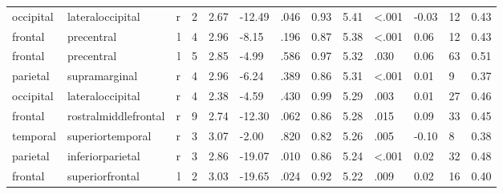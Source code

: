 \documentclass{article}
\begin{document}
\begin{longtable}{llrR{1.3cm}R{1cm}R{1.3cm}R{1cm}R{1cm}R{1.3cm}R{1cm}R{1.8cm}R{1.3cm}R{1.8cm}}
 occipital &          lateraloccipital &    r &         2 &                  2.67 &           -12.49 &               .046 &                               0.93 &                          5.41 &                   \textless.001 &  -0.03 &     12 &      0.43 \\
   frontal &                precentral &    l &         4 &                  2.96 &            -8.15 &               .196 &                               0.87 &                          5.38 &                   \textless.001 &   0.06 &     12 &      0.43 \\
   frontal &                precentral &    l &         5 &                  2.85 &            -4.99 &               .586 &                               0.97 &                          5.32 &                            .030 &   0.06 &     63 &      0.51 \\
  parietal &             supramarginal &    r &         4 &                  2.96 &            -6.24 &               .389 &                               0.86 &                          5.31 &                   \textless.001 &   0.01 &      9 &      0.37 \\
 occipital &          lateraloccipital &    r &         4 &                  2.38 &            -4.59 &               .430 &                               0.99 &                          5.29 &                            .003 &   0.01 &     27 &      0.46 \\
   frontal &      rostralmiddlefrontal &    r &         9 &                  2.74 &           -12.30 &               .062 &                               0.86 &                          5.28 &                            .015 &   0.09 &     33 &      0.45 \\
  temporal &          superiortemporal &    r &         3 &                  3.07 &            -2.00 &               .820 &                               0.82 &                          5.26 &                            .005 &  -0.10 &      8 &      0.38 \\
  parietal &          inferiorparietal &    r &         3 &                  2.86 &           -19.07 &               .010 &                               0.86 &                          5.24 &                   \textless.001 &   0.02 &     32 &      0.48 \\
   frontal &           superiorfrontal &    l &         2 &                  3.03 &           -19.65 &               .024 &                               0.92 &                          5.22 &                            .009 &   0.02 &     16 &      0.40 \\

\end{longtable}
\end{document}
